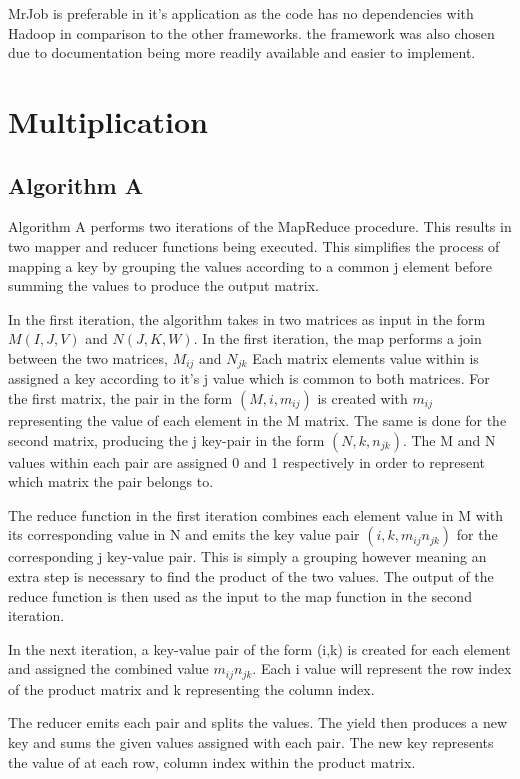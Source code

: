 \documentclass[10pt,twocolumn]{witseiepaper}
\begin{document}
MrJob is preferable in it's application as the code has no dependencies with Hadoop in comparison to the other frameworks. the framework was also chosen due to documentation being more readily available and easier to implement.

\section{Multiplication}

\subsection{Algorithm A} \label{algA}

Algorithm A performs two iterations of the MapReduce procedure.  This results in two mapper and reducer functions being executed. This simplifies the process of mapping a key by grouping the values according to a common j element before summing the values to produce the output matrix. 

In the first iteration, the algorithm takes in two matrices as input in the form $M(I, J, V )$ and $N(J, K, W)$. In the first iteration, the map performs a join between the two matrices, $M_{ij}$ and $N_{jk}$ Each matrix elements value within is assigned a key according to it's j value which is common to both matrices. For the first matrix, the pair in the form $(M, i, m_{ij})$ is created with $m_{ij}$ representing the value of each element in the M matrix. The same is done for the second matrix, producing the j key-pair in the form $(N, k, n_{jk})$. The M and N values within each pair are assigned 0 and 1 respectively in order to represent which matrix the pair belongs to.

The reduce function in the first iteration combines each element value in M with its corresponding value in N and emits the key value pair  $(i, k, m_{ij}n_{jk})$ for the corresponding j key-value pair. This is simply a grouping however meaning an extra step is necessary to find the product of the two values. The output of the reduce function is then used as the input to the map function in the second iteration.

In the next iteration, a key-value pair of the form (i,k) is created for each element and assigned the combined value $m_{ij}n_{jk}$. Each i value will represent the row index of the product matrix and k representing the column index. 

The reducer emits each pair and splits the values. The yield then produces a new key and sums the given values assigned with each pair. The new key represents the value of at each row, column index within the product matrix.
\end{document}
